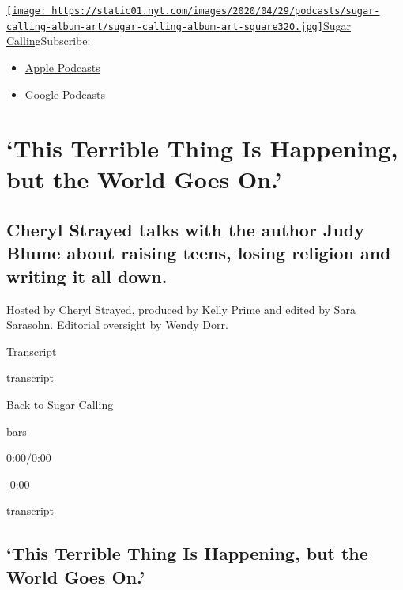 \href{https://www.nytimes.com/column/sugar-calling}{\texttt{[image: https://static01.nyt.com/images/2020/04/29/podcasts/sugar-calling-album-art/sugar-calling-album-art-square320.jpg]}Sugar
Calling}Subscribe:

\begin{itemize}
\tightlist
\item
  \href{https://itunes.apple.com/us/podcast/id1505881384}{Apple
  Podcasts}
\item
  \href{https://podcasts.google.com/?feed=aHR0cHM6Ly9yc3MuYXJ0MTkuY29tL3N1Z2FyLWNhbGxpbmc\&ved=0CAUQrrcFahcKEwjA8Kyn09voAhUAAAAAHQAAAAAQBQ}{Google
  Podcasts}
\end{itemize}

\hypertarget{this-terrible-thing-is-happening-but-the-world-goes-on-1}{%
\section{`This Terrible Thing Is Happening, but the World Goes
On.'}\label{this-terrible-thing-is-happening-but-the-world-goes-on-1}}

\hypertarget{cheryl-strayed-talks-with-the-author-judy-blume-about-raising-teens-losing-religion-and-writing-it-all-down-1}{%
\subsection{Cheryl Strayed talks with the author Judy Blume about
raising teens, losing religion and writing it all
down.}\label{cheryl-strayed-talks-with-the-author-judy-blume-about-raising-teens-losing-religion-and-writing-it-all-down-1}}

Hosted by Cheryl Strayed, produced by Kelly Prime and edited by Sara
Sarasohn. Editorial oversight by Wendy Dorr.

Transcript

transcript

Back to Sugar Calling

bars

0:00/0:00

-0:00

transcript

\hypertarget{this-terrible-thing-is-happening-but-the-world-goes-on-2}{%
\subsection{`This Terrible Thing Is Happening, but the World Goes
On.'}\label{this-terrible-thing-is-happening-but-the-world-goes-on-2}}

